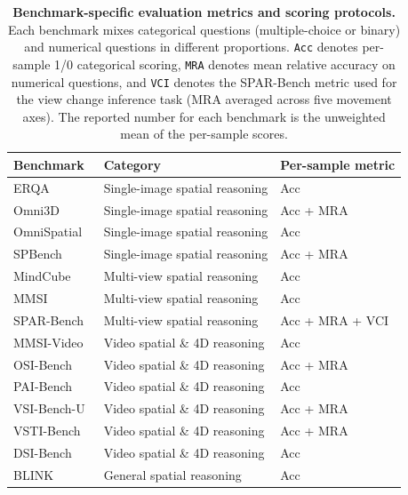 \begin{table}[h]
\caption{\textbf{Benchmark-specific evaluation metrics and scoring protocols.} Each benchmark mixes categorical questions (multiple-choice or binary) and numerical questions in different proportions. \texttt{Acc} denotes per-sample 1/0 categorical scoring, \texttt{MRA} denotes mean relative accuracy on numerical questions, and \texttt{VCI} denotes the SPAR-Bench metric used for the view change inference task (MRA averaged across five movement axes). The reported number for each benchmark is the unweighted mean of the per-sample scores.}
\label{tab:benchmark_metrics}
\centering
\setlength{\tabcolsep}{4pt}
\renewcommand{\arraystretch}{1.15}
{\small
\begin{tabular}{lll}
\toprule
\textbf{Benchmark} & \textbf{Category} & \textbf{Per-sample metric} \\
\midrule
ERQA~\citep{team2025gemini}             & Single-image spatial reasoning & Acc \\
Omni3D~\citep{marsili2025visual}        & Single-image spatial reasoning & Acc + MRA \\
OmniSpatial~\citep{jia2025omnispatial}  & Single-image spatial reasoning & Acc \\
SPBench~\citep{xu2025spbench}           & Single-image spatial reasoning & Acc + MRA \\
\midrule
MindCube~\citep{yin2025mindcube}        & Multi-view spatial reasoning & Acc \\
MMSI~\citep{yang2025mmsi}               & Multi-view spatial reasoning & Acc \\
SPAR-Bench~\citep{zhang2025from}        & Multi-view spatial reasoning & Acc + MRA + VCI \\
\midrule
MMSI-Video~\citep{lin2025mmsivideo}     & Video spatial \& 4D reasoning & Acc \\
OSI-Bench~\citep{wu2025osibench}        & Video spatial \& 4D reasoning & Acc + MRA \\
PAI-Bench~\citep{zhou2025paibench}      & Video spatial \& 4D reasoning & Acc \\
VSI-Bench-U~\citep{brown2025shortcuts}  & Video spatial \& 4D reasoning & Acc + MRA \\
VSTI-Bench~\citep{fan2025vlm}           & Video spatial \& 4D reasoning & Acc + MRA \\
DSI-Bench~\citep{zhang2025dsibench}     & Video spatial \& 4D reasoning & Acc \\
\midrule
BLINK~\citep{fu2024blink}               & General spatial reasoning & Acc \\

\end{tabular}}
\end{table}
